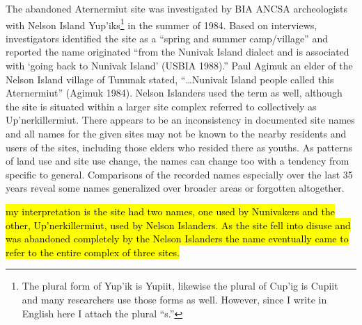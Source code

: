The abandoned Aternermiut site was investigated by BIA ANCSA archeologists with Nelson Island Yup’iks\footnote{The plural form of Yup’ik is Yupiit, likewise the plural of Cup’ig is Cupiit and many researchers use those forms as well. However, since I write in English here I attach the plural “s.”}  in the summer of 1984. Based on interviews, investigators identified the site as a “spring and summer camp/village” and reported the name originated “from the Nunivak Island dialect and is associated with ‘going back to Nunivak Island’ (USBIA 1988).” Paul Agimuk an elder of the Nelson Island village of Tununak stated, “…Nunivak Island people called this Aternermiut” (Agimuk 1984). Nelson Islanders used the term as well, although the site is situated within a larger site complex referred to collectively as Up’nerkillermiut. There appears to be an inconsistency in documented site names and all names for the given sites may not be known to the nearby residents and users of the sites, including those elders who resided there as youths. As patterns of land use and site use change, the names can change too with a tendency from specific to general. Comparisons of the recorded names especially over the last 35 years reveal some names generalized over broader areas or forgotten altogether.

\hl{my interpretation is the site had two names, one used by Nunivakers and the other, Up’nerkillermiut, used by Nelson Islanders. As the site fell into disuse and was abandoned completely by the Nelson Islanders the name eventually came to refer to the entire complex of three sites. }

